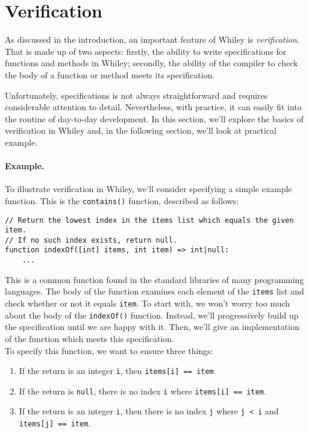 \newpage
\section{Verification}

As discussed in the introduction, an important feature of Whiley is
{\em verification}.  That is made up of two aspects: firstly, the
ability to write specifications for functions and methods in Whiley;
secondly, the ability of the compiler to check the body of a function
or method meets its specification.

Unfortunately, specifications is not always straightforward and
requires considerable attention to detail.  Nevertheless, with
practice, it can easily fit into the routine of day-to-day
development.  In this section, we'll explore the basics of
verification in Whiley and, in the following section, we'll look at
practical example.

\paragraph{Example.}  To illustrate verification in Whiley, we'll
consider specifying a simple example function.  This is the
\lstinline{contains()} function, described as follows:

\begin{lstlisting}
// Return the lowest index in the items list which equals the given item.
// If no such index exists, return null.
function indexOf([int] items, int item) => int|null:
    ...
\end{lstlisting}

This is a common function found in the standard libraries of many
programming languages.  The body of the function examines each element
of the \lstinline{items} list and check whether or not it equals
\lstinline{item}.  To start with, we won't worry too much about the
body of the \lstinline{indexOf()} function.  Instead, we'll
progressively build up the specification until we are happy with it.
Then, we'll give an implementation of the function which meets this
specification.\\

\noindent To specify this function, we want to ensure three things:

\begin{enumerate}
\item If the return is an integer \lstinline{i}, then
  \lstinline{items[i] == item}.
\item If the return is \lstinline{null}, there is no index
  \lstinline{i} where \lstinline{items[i] == item}.
\item If the return is an integer \lstinline{i}, then there is
  no index \lstinline{j} where \lstinline{j < i} and
  \lstinline{items[j] == item}.
\end{enumerate}


